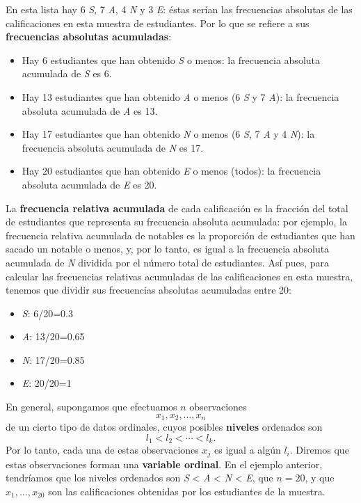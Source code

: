 \documentclass[
]{book}
\providecommand{\tightlist}{%
  \setlength{\itemsep}{0pt}\setlength{\parskip}{0pt}}
\theoremstyle{definition}
\theoremstyle{definition}
\theoremstyle{definition}
\theoremstyle{remark}
\begin{document}
En esta lista hay 6 \emph{S}, 7 \emph{A}, 4 \emph{N} y 3 \emph{E}: éstas serían las frecuencias absolutas de las calificaciones en esta muestra de estudiantes. Por lo que se refiere a sus \textbf{frecuencias absolutas acumuladas}:

\begin{itemize}
\tightlist
\item
  Hay 6 estudiantes que han obtenido \emph{S} o menos: la frecuencia absoluta acumulada de \emph{S} es 6.
\item
  Hay 13 estudiantes que han obtenido \emph{A} o menos (6 \emph{S} y 7 \emph{A}): la frecuencia absoluta acumulada de \emph{A} es 13.
\item
  Hay 17 estudiantes que han obtenido \emph{N} o menos (6 \emph{S}, 7 \emph{A} y 4 \emph{N}): la frecuencia absoluta acumulada de \emph{N} es 17.
\item
  Hay 20 estudiantes que han obtenido \emph{E} o menos (todos): la frecuencia absoluta acumulada de \emph{E} es 20.
\end{itemize}

La \textbf{frecuencia relativa acumulada} de cada calificación es la fracción del total de estudiantes que representa su frecuencia absoluta acumulada: por ejemplo, la frecuencia relativa acumulada de notables es la proporción de estudiantes que han sacado un notable o menos, y, por lo tanto, es igual a la frecuencia absoluta acumulada de \emph{N} dividida por el número total de estudiantes. Así pues, para calcular las frecuencias relativas acumuladas de las calificaciones en esta muestra, tenemos que dividir sus frecuencias absolutas acumuladas entre 20:

\begin{itemize}
\tightlist
\item
  \emph{S}: 6/20=0.3
\item
  \emph{A}: 13/20=0.65
\item
  \emph{N}: 17/20=0.85
\item
  \emph{E}: 20/20=1
\end{itemize}

En general, supongamos que efectuamos \(n\) observaciones
\[
x_1,x_2,\ldots,x_n
\]
de un cierto tipo de datos ordinales, cuyos posibles \textbf{niveles} ordenados son
\[
l_1<l_2<\cdots <l_k.
\]
Por lo tanto, cada una de estas observaciones \(x_j\) es igual a algún \(l_i\). Diremos que estas observaciones forman una \textbf{variable ordinal}. En el ejemplo anterior, tendríamos que los niveles ordenados son \emph{S} \textless{} \emph{A} \textless{} \emph{N} \textless{} \emph{E}, que \(n=20\), y que \(x_1,\ldots,x_{20}\) son las calificaciones obtenidas por los estudiantes de la muestra.
\end{document}
